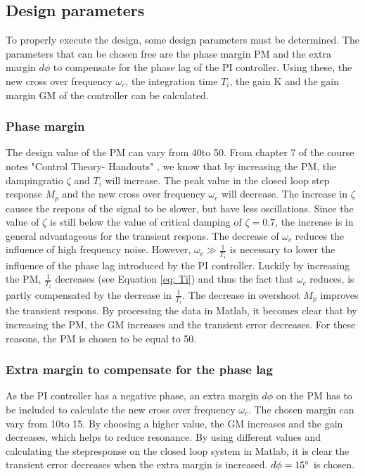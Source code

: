 \documentclass[a4paper,kul]{kulakarticle} %
\begin{document}
\subsection{Design parameters}
To properly execute the design, some design parameters must be determined. The parameters that can be chosen free are the phase margin PM and the extra margin $d\phi$ to compensate for the phase lag of the PI controller. Using these, the new cross over frequency $\omega_c$, the integration time $T_i$, the gain K and the gain margin GM of the controller can be calculated. 



\subsubsection{Phase margin}
The design value of the PM can vary from 40\degree to 50\degree. From chapter 7 of the course notes "Control Theory- Handouts" \cite{slidescontroltheory}, we know that by increasing the PM, the dampingratio $\zeta$ and $T_i$ will increase. The peak value in the closed loop step response $M_p$ and the new cross over frequency $\omega_c$ will decrease. The increase in $\zeta$ causes the respons of the signal to be slower, but have less oscillations. Since the value of $\zeta$ is still below the value of critical damping of $\zeta = 0.7$, the increase is in general advantageous for the transient respons. The decrease of $\omega_c$ %
 reduces the influence of high frequency noise. However, $\omega_c \gg \frac{1}{T_i}$ is necessary to lower the influence of the phase lag introduced by the PI controller. Luckily by increasing the PM, $\frac{1}{T_i}$ decreases (see Equation \ref{eq: Ti}) and thus the fact that $\omega_c$ reduces, is partly compensated by the decrease in $\frac{1}{T_i}$. The decrease in overshoot $M_p$ improves the transient respons. By processing the data in Matlab, it becomes clear that by increasing the PM, the GM increases and the transient error decreases. For these reasons, the PM is chosen to be equal to 50\degree. 

\subsubsection{Extra margin to compensate for the phase lag}
	As the PI controller has a negative phase, an extra margin $d\phi$ on the PM has to be included to calculate the new cross over frequency $\omega_c$. The chosen margin can vary from 10\degree to 15\degree. By choosing a higher value, the GM increases and the gain decreases, which helps to reduce resonance. By using different values and calculating the stepresponse on the closed loop system in Matlab, it is clear the transient error decreases when the extra margin is increased. $d\phi = 15\degree$ is chosen. 
\end{document}
